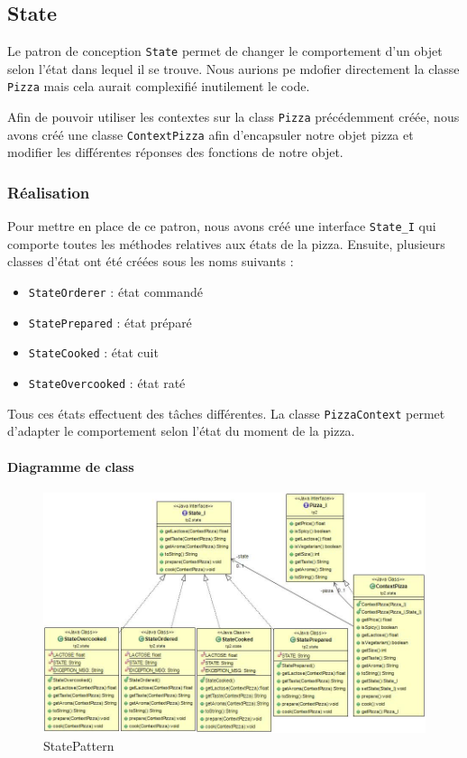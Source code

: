 \documentclass[french,]{article}
\providecommand{\tightlist}{%
  \setlength{\itemsep}{0pt}\setlength{\parskip}{0pt}}
\let\oldparagraph\paragraph
\renewcommand{\paragraph}[1]{\oldparagraph{#1}\mbox{}}
\begin{document}
\subsection{State}\label{state}

Le patron de conception \texttt{State} permet de changer le comportement
d'un objet selon l'état dans lequel il se trouve. Nous aurions pe
mdofier directement la classe \texttt{Pizza} mais cela aurait
complexifié inutilement le code.

Afin de pouvoir utiliser les contextes sur la class \texttt{Pizza}
précédemment créée, nous avons créé une classe \texttt{ContextPizza}
afin d'encapsuler notre objet pizza et modifier les différentes réponses
des fonctions de notre objet.

\subsubsection{Réalisation}\label{ruxe9alisation-2}

Pour mettre en place de ce patron, nous avons créé une interface
\texttt{State\_I} qui comporte toutes les méthodes relatives aux états
de la pizza. Ensuite, plusieurs classes d'état ont été créées sous les
noms suivants :

\begin{itemize}
\tightlist
\item
  \texttt{StateOrderer} : état commandé
\item
  \texttt{StatePrepared} : état préparé
\item
  \texttt{StateCooked} : état cuit
\item
  \texttt{StateOvercooked} : état raté
\end{itemize}

Tous ces états effectuent des tâches différentes. La classe
\texttt{PizzaContext} permet d'adapter le comportement selon l'état du
moment de la pizza.

\paragraph{Diagramme de class}\label{diagramme-de-class}

\begin{figure}[htbp]
\centering
\includegraphics{StatePattern.jpg}
\caption{StatePattern}
\end{figure}
\end{document}
